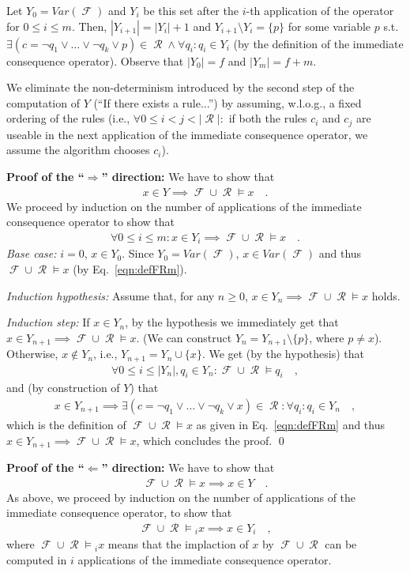 \documentclass [11pt]{article}
\newcommand{\Ra}{\Rightarrow}
\newcommand{\La}{\Leftarrow}
\DeclareMathOperator{\FF}{\mathcal{F}}
\DeclareMathOperator{\RR}{\mathcal{R}}
\newcommand{\FRm}{\ensuremath{\FF \cup \RR \models}}
\begin{document}
Let $Y_0 = Var(\FF)$ and $Y_i$ be this set after the $i$-th application of the operator for $0\leq i \leq m$.
Then, $|Y_{i+1}| = |Y_i| + 1$ and $Y_{i+1} \setminus Y_i = \{p\}$ for some variable $p$ s.t.~$\exists (c=\neg q_1 \lor \dots \lor \neg q_k \lor p)\in \RR \land \forall q_i:q_i \in Y_i$ (by the definition of the immediate consequence operator).
Observe that $|Y_0| = f$ and $|Y_m| = f + m$. 

We eliminate the non-determinism introduced by the second step of the computation of $Y$ (``If there exists a rule...'') by assuming, w.l.o.g., a fixed ordering of the rules (i.e., $\forall 0\leq i<j < |\RR|:$ if both the rules $c_i$ and $c_j$ are useable in the next application of the immediate consequence operator, we assume the algorithm chooses $c_i$).

\bigskip
\noindent
\textbf{Proof of the ``$\Ra$'' direction:} We have to show that 
\begin{align*}
x\in Y \implies \FRm x \quad .
\end{align*}
We proceed by induction on the number of applications of the immediate consequence operator to show that 
\begin{align*}
\forall 0\leq i \leq m: x \in Y_i \implies \FRm x \quad .
\end{align*}
\emph{Base case:} $i=0$, $x\in Y_0$. Since $Y_0 = Var(\FF)$, $x \in Var(\FF)$ and thus $\FRm x$ (by Eq.~\ref{eqn:defFRm}).  

\noindent
\emph{Induction hypothesis:} Assume that, for any $n\geq 0$, $x\in Y_n \implies \FRm x$ holds.

\noindent
\emph{Induction step:} If $x \in Y_n$, by the hypothesis we immediately get that $x\in Y_{n+1} \implies \FRm x$. (We can construct $Y_n = Y_{n+1} \setminus \{p\}$, where $p \neq x$). Otherwise, $x \not \in Y_n$, i.e., $Y_{n+1} = Y_{n} \cup \{x\}$. We get (by the hypothesis) that 
\begin{align*}
\forall 0 \leq i \leq |Y_n|, q_i \in Y_n: \FRm q_i \quad ,
\end{align*}
and (by construction of $Y$) that 
\begin{align*}
x \in Y_{n+1} \implies \exists (c=\neg q_1 \lor \dots \lor \neg q_k \lor x)\in \RR: \forall q_i: q_i \in Y_n \quad ,
\end{align*}
which is the definition of $\FRm x$ as given in Eq.~\ref{eqn:defFRm} and thus $x\in Y_{n+1} \implies \FRm x$, which concludes the proof. \qed


\bigskip
\noindent
\textbf{Proof of the ``$\La$'' direction:} We have to show that
\begin{align*}
\FRm x \implies x \in Y \quad .
\end{align*}
As above, we proceed by induction on the number of applications of the immediate consequence operator, to show that 
\begin{align*}
\FRm_i x \implies x \in Y_i \quad ,
\end{align*}
where $\FRm_i x$ means that the implaction of $x$ by $\FF \cup \RR$ can be computed in $i$ applications of the immediate consequence operator.
\end{document}
